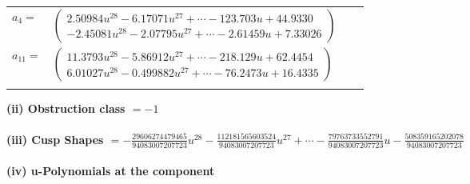 \documentclass[1p]{elsarticle_modified}
\theoremstyle{definition}
\begin{document}
\begin{tabular}{m{7pt} m{180pt} m{7pt} m{180pt} }
\flushright $a_{4}=$&$\begin{pmatrix}2.50984 u^{28}-6.17071 u^{27}+\cdots-123.703 u+44.9330\\-2.45081 u^{28}-2.07795 u^{27}+\cdots-2.61459 u+7.33026\end{pmatrix}$ \\
\flushright $a_{11}=$&$\begin{pmatrix}11.3793 u^{28}-5.86912 u^{27}+\cdots-218.129 u+62.4454\\6.01027 u^{28}-0.499882 u^{27}+\cdots-76.2473 u+16.4335\end{pmatrix}$\\&\end{tabular}
\flushleft \textbf{(ii) Obstruction class $= -1$}\\~\\
\flushleft \textbf{(iii) Cusp Shapes $= -\frac{29606274479465}{94083007207723} u^{28}-\frac{112181565603524}{94083007207723} u^{27}+\cdots-\frac{79763733552791}{94083007207723} u-\frac{508359165202078}{94083007207723}$}\\~\\
\newpage\renewcommand{\arraystretch}{1}
\flushleft \textbf{(iv) u-Polynomials at the component}\newline \\
\end{document}
